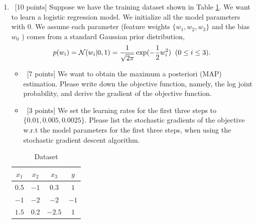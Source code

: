 \documentclass[12pt, fullpage,letterpaper]{article}
\begin{document}
\begin{enumerate}
	$\frac{\partial L}{\partial w^{1}_{02}} = (y-y^*)((w^3_{11})((w^2_{21})(\frac{\partial \sigma}{\partial s}\frac{\partial s}{\partial w^{1}_{02}})) + (w^3_{21})((w^2_{22})(\frac{\partial \sigma}{\partial s}\frac{\partial s}{\partial w^{1}_{02}}))) = (-3.436895)((2)((-3)(((0.99753)(0.00247))(1))+(-1.5)((3)(((0.99753)(0.00247))(1))))) = 0.12702$
	
	$\frac{\partial L}{\partial w^{1}_{12}} = (y-y^*)((w^3_{11})((w^2_{21})(\frac{\partial \sigma}{\partial s}\frac{\partial s}{\partial w^{1}_{12}})) + (w^3_{21})((w^2_{22})(\frac{\partial \sigma}{\partial s}\frac{\partial s}{\partial w^{1}_{12}}))) = (-3.436895)((2)((-3)(((0.99753)(0.00247))(1))+(-1.5)((3)(((0.99753)(0.00247))(1))))) = 0.12702$
	
	$\frac{\partial L}{\partial w^{1}_{22}} = (y-y^*)((w^3_{11})((w^2_{21})(\frac{\partial \sigma}{\partial s}\frac{\partial s}{\partial w^{1}_{22}})) + (w^3_{21})((w^2_{22})(\frac{\partial \sigma}{\partial s}\frac{\partial s}{\partial w^{1}_{22}}))) = (-3.436895)((2)((-3)(((0.99753)(0.00247))(1))+(-1.5)((3)(((0.99753)(0.00247))(1))))) = 0.12702$
	
	\item~[10 points] Suppose we have the training dataset shown in Table \ref{tb:dt}. We want to learn a logistic regression model. We initialize all the model parameters with $0$.  We assume each parameter (\ie feature weights $\{w_1, w_2, w_3\}$ and the bias $w_0$ ) comes from a standard Gaussian prior distribution, 
	\[
	p(w_i) = \mathcal{N}(w_i|0,1) = \frac{1}{\sqrt{2\pi}}\exp(-\frac{1}{2}w_i^2)\;\;(0\le i\le 3).
	\]
	
	\begin{itemize}
		\item~[7 points] We want to obtain the  maximum a posteriori (MAP) estimation. Please write down the objective function, namely, the log joint probability, and derive the gradient of the objective function. 
		\item~[3 points] We set the learning rates for the first three steps to $\{0.01, 0.005, 0.0025\}$.  Please list the stochastic gradients of the objective w.r.t the model parameters for the first three steps, when using the stochastic gradient descent algorithm. 
	\end{itemize}
	\begin{table}[h]
		\centering
		\begin{tabular}{ccc|c}
			$x_1$ & $x_2$ & $x_3$ &  $y$\\ 
			\hline\hline
			$0.5$ & $-1$ & $0.3$ & $1$ \\ \hline
			$-1$ & $-2$ & $-2$ & $-1$\\ \hline
			$1.5$ & $0.2$ & $-2.5$ & $1$\\ \hline
		\end{tabular}
	\caption{Dataset} 
	\label{tb:dt}
	\end{table}

	
\end{enumerate}
\end{document}
